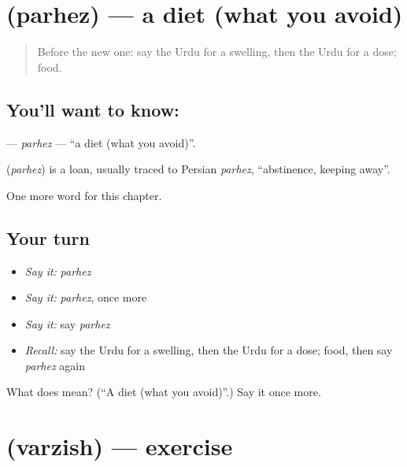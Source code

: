 \section[\texorpdfstring{\ur{پرہیز} (parhez)}{پرہیز (parhez)}]{ (parhez) — a diet (what you avoid)}

\label{lesson:UR-C187-parhez}



\begin{quote}
Before the new one: say the Urdu for a swelling, then the Urdu for a dose; food.
\end{quote}

\subsection*{You'll want to know: }
\textbf{} — \emph{parhez} — \textquotedblleft{}a diet (what you avoid)\textquotedblright{}.

\begin{cousinweb}
\textbf{} (\emph{parhez}) is a loan, usually traced to Persian \emph{parhez}, \textquotedblleft{}abstinence, keeping away\textquotedblright{}.
\end{cousinweb}

\begin{grammarlens}[title={What you've built}]
One more word for this chapter.
\end{grammarlens}

\subsection*{Your turn}
\begin{itemize}
\raggedright
  \item \emph{Say it:} \emph{parhez}
  \item \emph{Say it:} \emph{parhez}, once more
  \item \emph{Say it:} say \emph{parhez}
  \item \emph{Recall:} say the Urdu for a swelling, then the Urdu for a dose; food, then say \emph{parhez} again
\end{itemize}

\begin{tcolorbox}[breakable,colback=teal!4,colframe=teal!35!black,title={Before you move on}]
What does  mean? (\textquotedblleft{}A diet (what you avoid)\textquotedblright{}.) Say it once more.
\end{tcolorbox}
\section[\texorpdfstring{\ur{ورزش} (varzish)}{ورزش (varzish)}]{ (varzish) — exercise}

